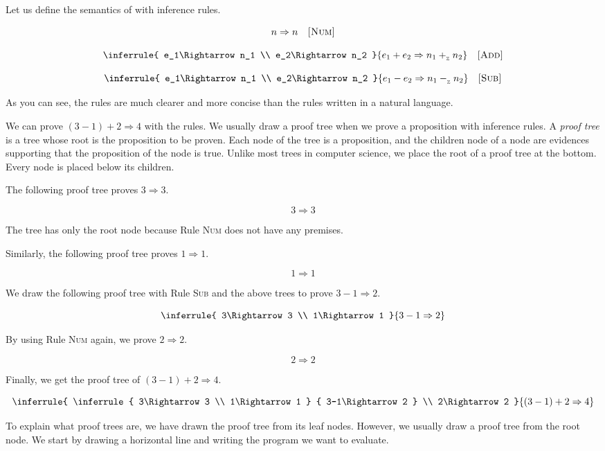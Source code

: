 Let us define the semantics of \lang with inference rules.

\[
  n\Rightarrow n
  \quad\textsc{[Num]}
\]

\[
  \inferrule
  { e_1\Rightarrow n_1 \\ e_2\Rightarrow n_2 }
  { e_1+e_2\Rightarrow n_1\iadd n_2 }
  \quad\textsc{[Add]}
\]

\[
  \inferrule
  { e_1\Rightarrow n_1 \\ e_2\Rightarrow n_2 }
  { e_1-e_2\Rightarrow n_1\isub n_2 }
  \quad\textsc{[Sub]}
\]

As you can see, the rules are much clearer and more concise than the rules
written in a natural language.

We can prove $(3-1)+2\Rightarrow4$ with the rules. We usually draw a proof tree
when we prove a proposition with inference rules. A \textit{proof
tree} is a tree whose root is the proposition to be proven.
Each node of the tree is a proposition, and the children node of a node are
evidences supporting that the proposition of the node is true. Unlike most trees in
computer science, we place the root of a proof tree at the bottom. Every node is
placed below its children.

The following proof tree proves $3\Rightarrow3$.

\[3\Rightarrow3\]

The tree has only the root node because Rule \textsc{Num} does not have any
premises.

Similarly, the following proof tree proves $1\Rightarrow1$.

\[1\Rightarrow1\]

We draw the following proof tree with Rule \textsc{Sub} and the above trees
to prove $3-1\Rightarrow2$.

\[
  \inferrule
  { 3\Rightarrow3 \\ 1\Rightarrow1 }
  { 3-1\Rightarrow2 }
\]

By using Rule \textsc{Num} again, we prove $2\Rightarrow2$.

\[2\Rightarrow2\]

Finally, we get the proof tree of $(3-1)+2\Rightarrow4$.

\[
  \inferrule
  {
    \inferrule
    { 3\Rightarrow3 \\ 1\Rightarrow1 }
    { 3-1\Rightarrow2 }
    \\
    2\Rightarrow2
  }
  { (3-1)+2\Rightarrow4 }
\]

To explain what proof trees are, we have drawn the proof tree from its leaf
nodes. However, we usually draw a proof tree from the root node.
We start by drawing a horizontal line and writing the program we want to evaluate.

